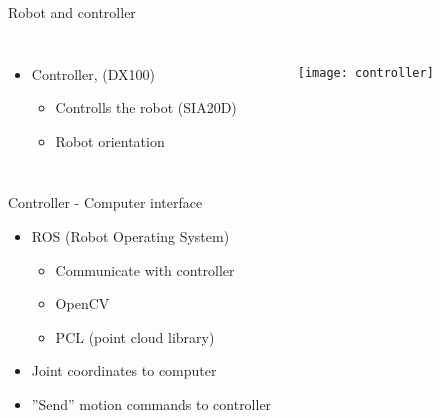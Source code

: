 \begin{frame}{Robot and controller}
\begin{columns}

\begin{itemize}
\item Controller, (DX100)
\begin{itemize}
\item Controlls the robot (SIA20D)
\item Robot orientation 
\end{itemize}
\end{itemize}

    \begin{figure}[H]
	\begin{center}
	\texttt{[image: controller]}
	\end{center}
	\end{figure}
    \end{columns}

\end{frame}

\begin{frame}{Controller - Computer interface}


\begin{itemize}
\item ROS (Robot Operating System)
\begin{itemize}
	\item Communicate with controller
	\item OpenCV
	\item PCL (point cloud library)
\end{itemize}
\item Joint coordinates to computer
\item ''Send'' motion commands to controller
\end{itemize}

\end{frame}



